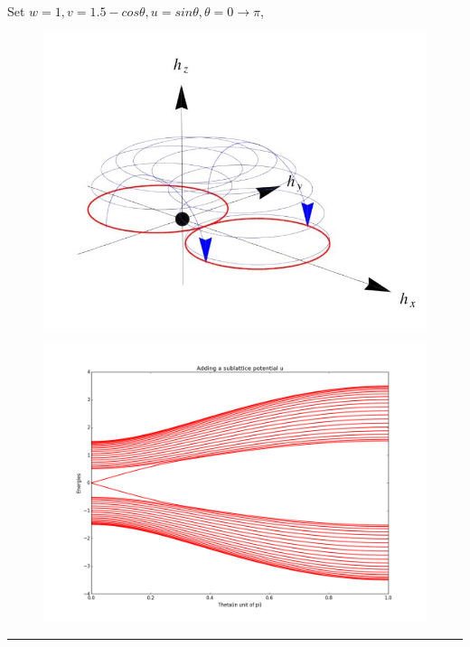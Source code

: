 \documentclass[letterpaper,10pt,english]{sphinxmanual}
\begin{document}
Set \(w=1, v=1.5-cos\theta, u=sin\theta, \theta=0\to \pi\),
\begin{figure}[htbp]
\centering

\includegraphics[width=0.700\linewidth]{b.jpg}
\end{figure}
\begin{figure}[htbp]
\centering

\includegraphics[width=0.700\linewidth]{figure_2.png}
\end{figure}


\bigskip\hrule{}\bigskip
\end{document}
